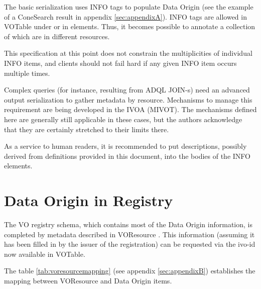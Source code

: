 \documentclass[11pt,a4paper]{ivoa}
\begin{document}
The basic serialization uses INFO tags to populate Data Origin (see the example of a ConeSearch result in appendix  \ref{sec:appendixA}).
INFO tags are allowed in VOTable under  or in  elements.
Thus, it becomes possible to annotate a collection of  which are in different resources.

This specification at this point does not constrain the multiplicities of individual INFO items, and clients should not fail hard if any given INFO item occurs multiple times.

Complex queries (for instance, resulting from ADQL JOIN-s) need an advanced output serialization to gather metadata by resource.
Mechanisms to manage this requirement are being developed in the IVOA
(MIVOT).
The mechanisms defined here are generally still applicable in these
cases, but the authors acknowledge that they are certainly stretched to
their limits there.

As a service to human readers, it is recommended to put descriptions, possibly derived from definitions provided in this document, into the bodies of the INFO elements.


\section{Data Origin in Registry}
The VO registry schema, which contains most of the Data Origin information, is completed by metadata described in VOResource \citep{2018ivoa.spec.0625P}.
This information (assuming it has been filled in by the issuer of the registration) can be requested via the ivo-id now available in VOTable.

The table \ref{tab:voresourcemapping} (see appendix \ref{sec:appendixB}) establishes the mapping between VOResource and Data Origin items.

%



\appendix
\end{document}
